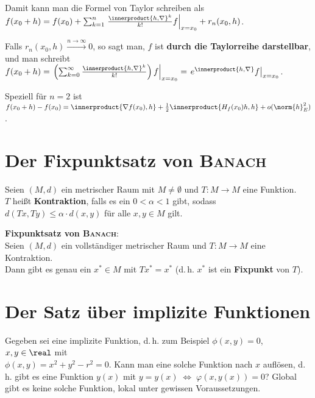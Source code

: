 Damit kann man die Formel von Taylor schreiben als \\
$f(x_0 + h) = f(x_0) + \sum_{k=1}^n
\left.\frac{\innerproduct{h, \nabla}^k}{k!} f\right|_{x=x_0} + r_n(x_0, h)$.

Falls $r_n(x_0, h) \xrightarrow{n \to \infty} 0$, so sagt man,
$f$ ist \textbf{durch die Taylorreihe darstellbar}, und man schreibt
$f(x_0 + h) = \left.\left(\sum_{k=0}^\infty
\frac{\innerproduct{h, \nabla}^k}{k!}\right) f\right|_{x=x_0} =
\left.e^{\innerproduct{h, \nabla}} f\right|_{x=x_0}$.

Speziell für $n = 2$ ist
$f(x_0 + h) - f(x_0) =
\innerproduct{\nabla f(x_0), h} + \frac{1}{2} \innerproduct{H_f(x_0) h, h} + o(\norm{h}_E^2)$.

\section{%
    Der Fixpunktsatz von \textsc{Banach}%
}

Seien $(M, d)$ ein metrischer Raum mit $M \not= \emptyset$
und $T: M \rightarrow M$ eine Funktion. \\
$T$ heißt \textbf{Kontraktion}, falls es ein $0 < \alpha < 1$ gibt, sodass
$d(Tx, Ty) \le \alpha \cdot d(x, y)$ für alle $x, y \in M$ gilt.

\textbf{Fixpunktsatz von \textsc{Banach}}: \\
Seien $(M, d)$ ein vollständiger metrischer Raum und $T: M \rightarrow M$
eine Kontraktion. \\
Dann gibt es genau ein $x^\ast \in M$ mit $Tx^\ast = x^\ast$
(d.\,h. $x^\ast$ ist ein \textbf{Fixpunkt} von $T$).

\section{%
    Der Satz über implizite Funktionen%
}

Gegeben sei eine implizite Funktion, d.\,h. zum Beispiel
$\phi(x, y) = 0$, $x, y \in \real$ mit \\
$\phi(x, y) = x^2 + y^2 - r^2 = 0$.
Kann man eine solche Funktion nach $x$ auflösen, d.\,h. gibt es eine
Funktion $y(x)$ mit $y = y(x) \;\Leftrightarrow\; \varphi(x, y(x)) = 0$?
Global gibt es keine solche Funktion, lokal unter gewissen Voraussetzungen.

\linie

